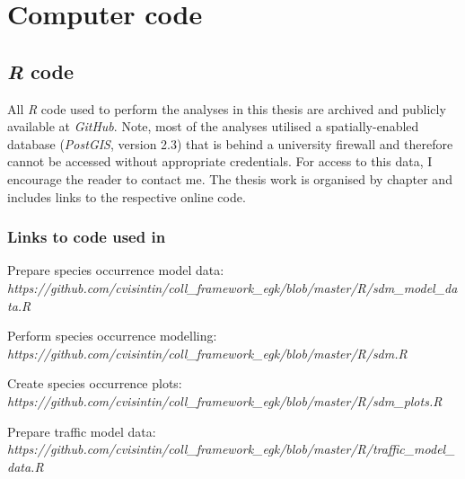 \chapter{Computer code}\label{apx:A}
\newpage

\section{\textit{R} code}

All \textit{R} code used to perform the analyses in this thesis are archived and publicly available at \textit{GitHub}. Note, most of the analyses utilised a spatially-enabled database (\textit{PostGIS}, version 2.3) that is behind a university firewall and therefore cannot be accessed without appropriate credentials. For access to this data, I encourage the reader to contact me. The thesis work is organised by chapter and includes links to the respective online code.

\subsection{Links to code used in }

\noindent Prepare species occurrence model data:\\
\textit{https://github.com/cvisintin/coll\_framework\_egk/blob/master/R/sdm\_model\_data.R}
%

\vspace{.3cm}
\noindent Perform species occurrence modelling:\\
\textit{https://github.com/cvisintin/coll\_framework\_egk/blob/master/R/sdm.R}
%

\vspace{.3cm}
\noindent Create species occurrence plots:\\
\textit{https://github.com/cvisintin/coll\_framework\_egk/blob/master/R/sdm\_plots.R}
%

\vspace{.3cm}
\noindent Prepare traffic model data:\\
\textit{https://github.com/cvisintin/coll\_framework\_egk/blob/master/R/traffic\_model\_data.R}
%

